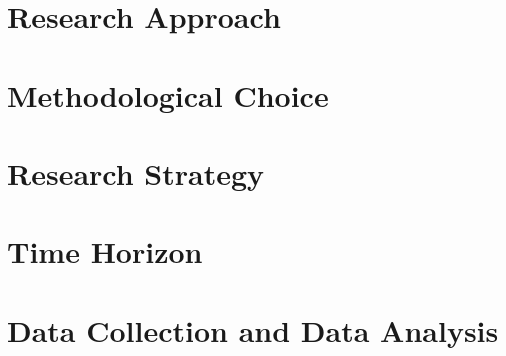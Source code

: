 \section{Research Approach}\label{sec:research-approach}

%
\section{Methodological Choice}\label{sec:methodological-choice}

%
\section{Research Strategy}\label{sec:research-strategy}

%
\section{Time Horizon}\label{sec:time-horizon}

%
\section{Data Collection and Data Analysis}\label{sec:data-collectiom-and-data-analysis}
